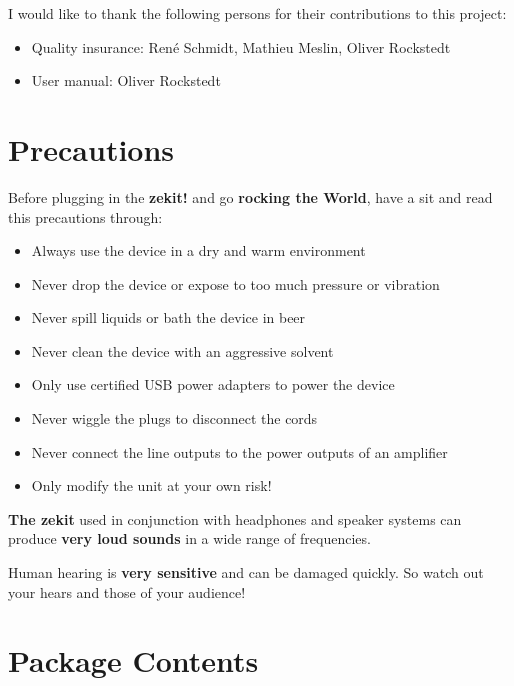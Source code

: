 \documentclass{scrartcl}
\begin{document}
I would like to thank the following persons for their contributions to this project:

\begin{itemize}
    \item Quality insurance: René Schmidt, Mathieu Meslin, Oliver Rockstedt
    \item User manual: Oliver Rockstedt
\end{itemize}

\section*{Precautions}
Before plugging in the \textbf{zekit!} and go \textbf{rocking the World}, have a sit and read this precautions through:

\begin{itemize}
    \item Always use the device in a dry and warm environment
    \item Never drop the device or expose to too much pressure or vibration
    \item Never spill liquids or bath the device in beer
    \item Never clean the device with an aggressive solvent
    \item Only use certified USB power adapters to power the device
    \item Never wiggle the plugs to disconnect the cords
    \item Never connect the line outputs to the power outputs of an amplifier
    \item Only modify the unit at your own risk!
\end{itemize}

\textbf{The zekit} used in conjunction with headphones and speaker systems can produce \textbf{very loud sounds} in a wide range of frequencies.

Human hearing is \textbf{very sensitive} and can be damaged quickly. So watch out your hears and those of your audience!

\pagebreak


\tableofcontents
\pagebreak


\section{Package Contents}
\end{document}
